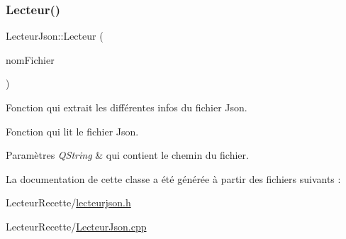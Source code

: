 \subsubsection{\texorpdfstring{Lecteur()}{Lecteur()}}
{\footnotesize\ttfamily Lecteur\+Json\+::\+Lecteur (\begin{DoxyParamCaption}\item[{Q\+String}]{nom\+Fichier }\end{DoxyParamCaption})}



Fonction qui extrait les différentes infos du fichier Json. 

Fonction qui lit le fichier Json.


\begin{DoxyParams}{Paramètres}
{\em Q\+String} & qui contient le chemin du fichier. \\
\hline
\end{DoxyParams}


La documentation de cette classe a été générée à partir des fichiers suivants \+:\begin{DoxyCompactItemize}
\item 
Lecteur\+Recette/\hyperlink{lecteurjson_8h}{lecteurjson.\+h}\item 
Lecteur\+Recette/\hyperlink{_lecteur_json_8cpp}{Lecteur\+Json.\+cpp}\end{DoxyCompactItemize}
